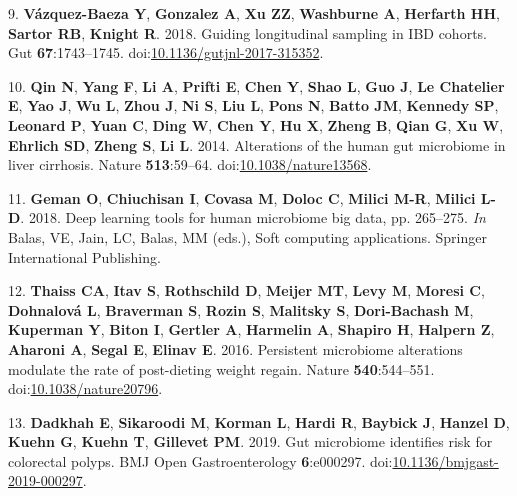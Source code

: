 \documentclass[11pt,]{article}
\begin{document}
\hypertarget{ref-vazquez-baeza_guiding_2018}{}
9. \textbf{Vázquez-Baeza Y}, \textbf{Gonzalez A}, \textbf{Xu ZZ},
\textbf{Washburne A}, \textbf{Herfarth HH}, \textbf{Sartor RB},
\textbf{Knight R}. 2018. Guiding longitudinal sampling in IBD cohorts.
Gut \textbf{67}:1743--1745.
doi:\href{https://doi.org/10.1136/gutjnl-2017-315352}{10.1136/gutjnl-2017-315352}.

\hypertarget{ref-qin_alterations_2014}{}
10. \textbf{Qin N}, \textbf{Yang F}, \textbf{Li A}, \textbf{Prifti E},
\textbf{Chen Y}, \textbf{Shao L}, \textbf{Guo J}, \textbf{Le Chatelier
E}, \textbf{Yao J}, \textbf{Wu L}, \textbf{Zhou J}, \textbf{Ni S},
\textbf{Liu L}, \textbf{Pons N}, \textbf{Batto JM}, \textbf{Kennedy SP},
\textbf{Leonard P}, \textbf{Yuan C}, \textbf{Ding W}, \textbf{Chen Y},
\textbf{Hu X}, \textbf{Zheng B}, \textbf{Qian G}, \textbf{Xu W},
\textbf{Ehrlich SD}, \textbf{Zheng S}, \textbf{Li L}. 2014. Alterations
of the human gut microbiome in liver cirrhosis. Nature
\textbf{513}:59--64.
doi:\href{https://doi.org/10.1038/nature13568}{10.1038/nature13568}.

\hypertarget{ref-geman_deep_2018}{}
11. \textbf{Geman O}, \textbf{Chiuchisan I}, \textbf{Covasa M},
\textbf{Doloc C}, \textbf{Milici M-R}, \textbf{Milici L-D}. 2018. Deep
learning tools for human microbiome big data, pp. 265--275. \emph{In}
Balas, VE, Jain, LC, Balas, MM (eds.), Soft computing applications.
Springer International Publishing.

\hypertarget{ref-thaiss_persistent_2016}{}
12. \textbf{Thaiss CA}, \textbf{Itav S}, \textbf{Rothschild D},
\textbf{Meijer MT}, \textbf{Levy M}, \textbf{Moresi C},
\textbf{Dohnalová L}, \textbf{Braverman S}, \textbf{Rozin S},
\textbf{Malitsky S}, \textbf{Dori-Bachash M}, \textbf{Kuperman Y},
\textbf{Biton I}, \textbf{Gertler A}, \textbf{Harmelin A},
\textbf{Shapiro H}, \textbf{Halpern Z}, \textbf{Aharoni A},
\textbf{Segal E}, \textbf{Elinav E}. 2016. Persistent microbiome
alterations modulate the rate of post-dieting weight regain. Nature
\textbf{540}:544--551.
doi:\href{https://doi.org/10.1038/nature20796}{10.1038/nature20796}.

\hypertarget{ref-dadkhah_gut_2019}{}
13. \textbf{Dadkhah E}, \textbf{Sikaroodi M}, \textbf{Korman L},
\textbf{Hardi R}, \textbf{Baybick J}, \textbf{Hanzel D}, \textbf{Kuehn
G}, \textbf{Kuehn T}, \textbf{Gillevet PM}. 2019. Gut microbiome
identifies risk for colorectal polyps. BMJ Open Gastroenterology
\textbf{6}:e000297.
doi:\href{https://doi.org/10.1136/bmjgast-2019-000297}{10.1136/bmjgast-2019-000297}.
\end{document}
